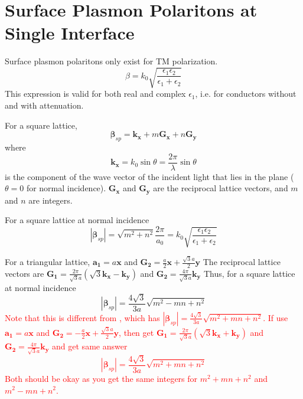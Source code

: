 \documentclass[12pt]{article}
\date{\today }
\author{
Paul W. Leu\\
University of Pittsburgh\\
Pittsburgh, PA}
\numberwithin{equation}{section}
\newcommand{\red}[1]{\textcolor{red}{#1}} %
\begin{document}
\tableofcontents

\section{Surface Plasmon Polaritons at Single Interface}

Surface plasmon polaritons only exist for TM polarization.  
\begin{equation}
\boxed{\beta =  k_0  \sqrt{ \frac{\epsilon_1 \epsilon_2}{\epsilon_1 + \epsilon_2} }}
\end{equation}
This expression is valid for both real and complex $\epsilon_1$, i.e. for conductors without
and with attenuation.

For a square lattice, \cite{Thio:99}
\begin{equation}
\bm{\beta}_{sp} = \bm{k_x} + m \bm{G_x} + n \bm{G_y}
\end{equation}
where 
\begin{equation}
\bm{k_x} = k_0  \sin \theta = \frac{2 \pi}{\lambda} \sin \theta 
\end{equation}
is the component of the wave vector of the incident light that lies in the plane ($\theta = 0$ for normal incidence).  
$\bm{G_x}$ and $\bm{G_y}$ are the reciprocal lattice vectors, and $m$ and $n$ are integers.  

For a square lattice at normal incidence
\begin{equation}
| \bm{\beta}_{sp} | = \sqrt{m^2 + n^2} \frac{2 \pi}{a_0} = k_0  \sqrt{ \frac{\epsilon_1 \epsilon_2}{\epsilon_1 + \epsilon_2} }
\end{equation}

For a triangular lattice, 
$\bm{a_1} = a \bm{x}$ and $\bm{G_2} = \frac{a}{2} \bm{x} + \frac{\sqrt{3} a}{2} \bm{y}$
The reciprocal lattice vectors are 
$\bm{G_1} = \frac{2 \pi}{\sqrt{3} a} \left ( \sqrt{3} \bm{k_x} - \bm{k_y} \right )$ and 
$\bm{G_2} = \frac{4 \pi}{\sqrt{3} a} \bm{k_y} $
Thus, for a square lattice at normal incidence
\begin{equation}
| \bm{\beta}_{sp} | = \frac{4 \sqrt{3}}{3 a} \sqrt{m^2 - mn + n^2}
\end{equation}
\red{Note that this is different from \cite{Thio:99}, which has 
$| \bm{\beta}_{sp} | = \frac{4 \sqrt{3}}{3 a} \sqrt{m^2 + mn + n^2}$.
If use $\bm{a_1} = a \bm{x}$ and $\bm{G_2} = - \frac{a}{2} \bm{x} + \frac{\sqrt{3} a}{2} \bm{y}$, 
then get 
$\bm{G_1} = \frac{2 \pi}{\sqrt{3} a} \left ( \sqrt{3} \bm{k_x} + \bm{k_y} \right )$ and 
$\bm{G_2} = \frac{4 \pi}{\sqrt{3} a} \bm{k_y} $ and get same answer
\begin{equation}
| \bm{\beta}_{sp} | = \frac{4 \sqrt{3}}{3 a} \sqrt{m^2 + mn + n^2}
\end{equation}
Both should be okay as you get the same integers for $m^2 + mn + n^2$ and $m^2 - mn + n^2$.  
}
\end{document}
